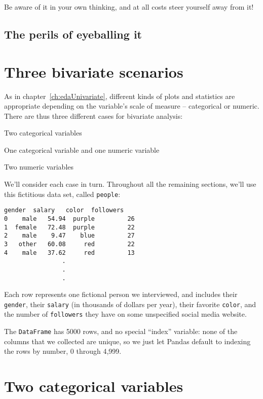 Be aware of it in your own thinking, and at all costs steer yourself away from
it!

\subsection{The perils of eyeballing it}

\section{Three bivariate scenarios}

As in chapter~\ref{ch:edaUnivariate}, different kinds of plots and statistics
are appropriate depending on the variable's scale of measure -- categorical or
numeric. There are thus three different cases for bivariate analysis:

\begin{compactitem}
\item Two categorical variables
\item One categorical variable and one numeric variable
\item Two numeric variables
\end{compactitem}

We'll consider each case in turn. Throughout all the remaining sections, we'll
use this fictitious data set, called \texttt{people}:

\begin{Verbatim}[fontsize=\small,samepage=true,frame=leftline,framesep=5mm,framerule=1mm]
   gender  salary   color  followers
0    male   54.94  purple         26
1  female   72.48  purple         22
2    male    9.47    blue         27
3   other   60.08     red         22
4    male   37.62     red         13
                .
                .
                .
\end{Verbatim}

Each row represents one fictional person we interviewed, and includes their 
\texttt{gender}, their \texttt{salary} (in thousands of dollars per year),
their favorite \texttt{color}, and the number of \texttt{followers} they have
on some unspecified social media website.

The \texttt{DataFrame} has 5000 rows, and no special ``index'' variable: none
of the columns that we collected are unique, so we just let Pandas default to
indexing the rows by number, 0 through 4,999.


\section{Two categorical variables}

